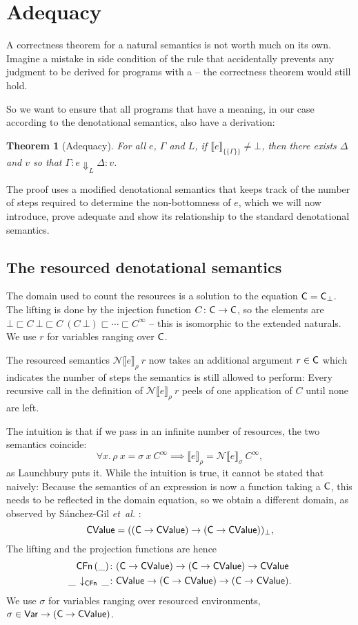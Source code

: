 \documentclass{jfp1}
\newtheorem{theorem}{Theorem}
\theoremstyle{nonumberbreak}
\newcommand{\sVar}   {\text{\textsf{Var}}}
\newcommand{\sCValue}{\text{\textsf{CValue}}}
\newcommand{\sC}     {\text{\textsf{C}}}
\newcommand{\sCFn}[1]{\text{\textsf{CFn}}\,(#1)}
\newcommand{\sCFnProj}[2]{#1\,\downarrow_{\text{\textsf{CFn}}}\,#2}
\newcommand{\keyword}[1]{\text{\textsf{#1}}}
\newcommand{\sred}[5]{#1 : #2 \Downarrow_{#3} #4 : #5}
\newcommand{\sRule}[1]{\text{{\textsc{#1}}}}
\newcommand{\dsem}[2]{\llbracket #1 \rrbracket_{#2}}
\newcommand{\esem}[1]{\{\!\!\!\{#1\}\!\!\!\}}
\newcommand{\dsemr}[2]{\mathcal N\!\llbracket #1 \rrbracket_{#2}}
\begin{document}
\section{Adequacy}

A correctness theorem for a natural semantics is not worth much on its own. Imagine a mistake in side condition of the \sRule{Let} rule that accidentally prevents any judgment to be derived for programs with a \keyword{let} -- the correctness theorem would still hold.

So we want to ensure that all programs that have a meaning, in our case according to the denotational semantics, also have a derivation:

\begin{theorem}[Adequacy]
For all $e$, $\Gamma$ and $L$, if $\dsem{e}{\esem{\Gamma}} \ne \bot$, then there exists $\Delta$ and $v$ so that $\sred \Gamma e L \Delta v$.
\label{thm_adequacy}
\end{theorem}

The proof uses a modified denotational semantics that keeps track of the number of steps required to determine the non-bottomness of $e$, which we will now introduce, prove adequate and show its relationship to the standard denotational semantics.

\subsection{The resourced denotational semantics}

The domain used to count the resources is a solution to the equation $\sC = \sC_\bot$. The lifting is done by the injection function $C \colon \sC \to \sC$, so the elements are $\bot \sqsubset C~\bot \sqsubset C~(C~\bot) \sqsubset \cdots \sqsubset C^\infty$ – this is isomorphic to the extended naturals. We use $r$ for variables ranging over $\sC$.


The resourced semantics $\dsemr{e}{\rho}~r$ now takes an additional argument $r \in \sC$ which indicates the number of steps the semantics is still allowed to perform: Every recursive call in the definition of $\dsemr{e}{\rho}~r$ peels of one application of $C$ until none are left.

The intuition is that if we pass in an infinite number of resources, the two semantics coincide: \[
\forall x.\, \rho~x = \sigma~x~C^\infty \implies \dsem{e}{\rho} = \dsemr{e}{\sigma}~C^\infty,
\]
as Launchbury puts it. While the intuition is true, it cannot be stated that naively: Because the semantics of an expression is now a function taking a $\sC$, this needs to be reflected in the domain equation, so we obtain a different domain, as observed by S{\'a}nchez-Gil {\em et~al.} :
\[
\sCValue = ((\sC \to \sCValue) \to (\sC \to \sCValue))_\bot,
\]
The lifting and the projection functions are hence
\begin{align*}
\sCFn \_ &\colon (\sC \to \sCValue) \to (\sC \to \sCValue) \to \sCValue \\
\sCFnProj{\_}{\_} &\colon \sCValue \to (\sC\to\sCValue) \to (\sC \to \sCValue).
\end{align*}
We use $\sigma$ for variables ranging over resourced environments, $\sigma \in \sVar \to (\sC \to \sCValue)$.
\end{document}
